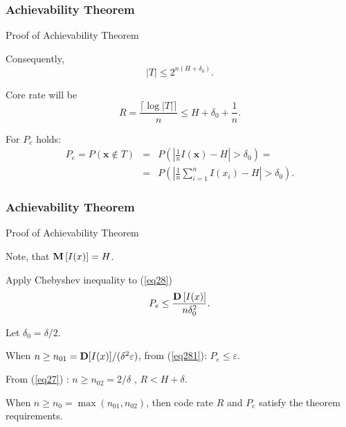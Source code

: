 \documentclass[14pt]{beamer}
\renewcommand{\vec}[1]{\ensuremath{\boldsymbol{#1}}}
\begin{document}
\begin{frame}
\frametitle{Achievability Theorem}
Proof of Achievability Theorem
\begin{itemize}
\small{  

    \item Consequently,
    \begin{equation}
    \label{eq26}
    \vert T\vert \le 2^{n(H + \delta _0 )}.
    \end{equation}

    \item Core rate will be
    \begin{equation}
    \label{eq27} R =\frac{ \lceil \log  \vert T\vert  \rceil}{n} \le H
    + \delta _0+\frac{1}{n} .
    \end{equation}

    \item For $P_e $ holds:
    \begin{eqnarray}
    P_e = P(\vec x \notin T) &=& P\left( {\left| {\frac{1}{n}I(\vec
    x) - H} \right| > \delta _0 } \right)= \nonumber \\
    \label{eq28}
    &=& P\left( {\left| {\frac{1}{n}\sum\limits_{i = 1}^n
    {I(x_i )} - H} \right|
    > \delta _0 } \right).
    \end{eqnarray}
}
\end{itemize}
\end{frame}



\begin{frame}
\frametitle{Achievability Theorem}
Proof of Achievability Theorem
\begin{itemize}
\small{  

    \item Note, that ${\rm {\bf M}}\left[ {I(x)} \right] = H$. 
    
    \item Apply Chebyshev inequality to (\ref{eq28}) 
    \begin{equation}
    \label{eq281} P_e \le \frac {{\rm {\bf D}}\left[ {I(x)}
    \right]}{n\delta _0^2 }.
    \end{equation}

    \item Let $\delta_0 = \delta / 2$. 
    \item When $n \geq n_{01} = {{\rm {\bf D}}[I(x)]} / (\delta ^2\varepsilon )$, from  (\ref{eq281}):
    $P_e \le \varepsilon $. 
    
    \item From (\ref{eq27}) :
    $n \ge n_{02}=2/\delta$ , $R < H + \delta $.
    \item When $n \geq n_0=\max(n_{01},n_{02})$, then code rate $R$ and $P_e$ satisfy the theorem requirements.  
}
\end{itemize}
\end{frame}
\end{document}
